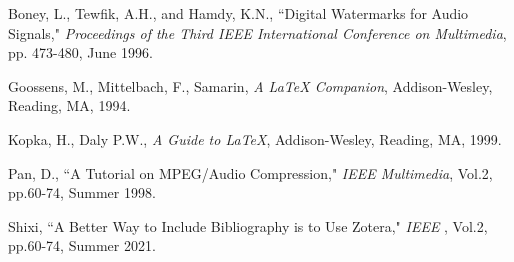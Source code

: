 \documentclass[11pt]{article}
\begin{document}
%

\begin{thebibliography}{100}
	
	 Boney, L., Tewfik, A.H., and Hamdy, K.N., ``Digital
	Watermarks for Audio Signals," \emph{Proceedings of the Third IEEE
		International Conference on Multimedia}, pp. 473-480, June 1996.
	
	 Goossens, M., Mittelbach, F., Samarin, \emph{A LaTeX
		Companion}, Addison-Wesley, Reading, MA, 1994.
	
	 Kopka, H., Daly P.W., \emph{A Guide to LaTeX},
	Addison-Wesley, Reading, MA, 1999.
	
	 Pan, D., ``A Tutorial on MPEG/Audio Compression," \emph{IEEE
		Multimedia}, Vol.2, pp.60-74, Summer 1998.
	
	 Shixi, ``A Better Way to Include Bibliography is to Use Zotera," \emph{IEEE
		}, Vol.2, pp.60-74, Summer 2021.
	
\end{thebibliography}
\end{document}
